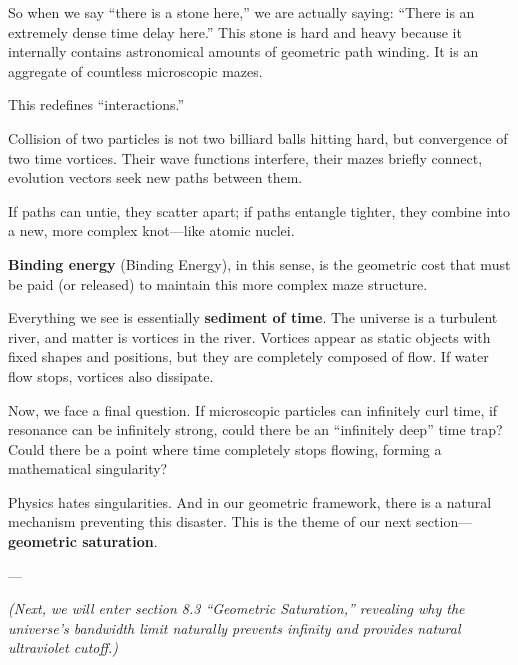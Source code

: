 So when we say ``there is a stone here,'' we are actually saying: ``There is an extremely dense time delay here.'' This stone is hard and heavy because it internally contains astronomical amounts of geometric path winding. It is an aggregate of countless microscopic mazes.

This redefines ``interactions.''

Collision of two particles is not two billiard balls hitting hard, but convergence of two time vortices. Their wave functions interfere, their mazes briefly connect, evolution vectors seek new paths between them.

If paths can untie, they scatter apart; if paths entangle tighter, they combine into a new, more complex knot---like atomic nuclei.

\textbf{Binding energy} (Binding Energy), in this sense, is the geometric cost that must be paid (or released) to maintain this more complex maze structure.

Everything we see is essentially \textbf{sediment of time}. The universe is a turbulent river, and matter is vortices in the river. Vortices appear as static objects with fixed shapes and positions, but they are completely composed of flow. If water flow stops, vortices also dissipate.

Now, we face a final question. If microscopic particles can infinitely curl time, if resonance can be infinitely strong, could there be an ``infinitely deep'' time trap? Could there be a point where time completely stops flowing, forming a mathematical singularity?

Physics hates singularities. And in our geometric framework, there is a natural mechanism preventing this disaster. This is the theme of our next section---\textbf{geometric saturation}.

---

\textit{(Next, we will enter section 8.3 ``Geometric Saturation,'' revealing why the universe's bandwidth limit naturally prevents infinity and provides natural ultraviolet cutoff.)}

